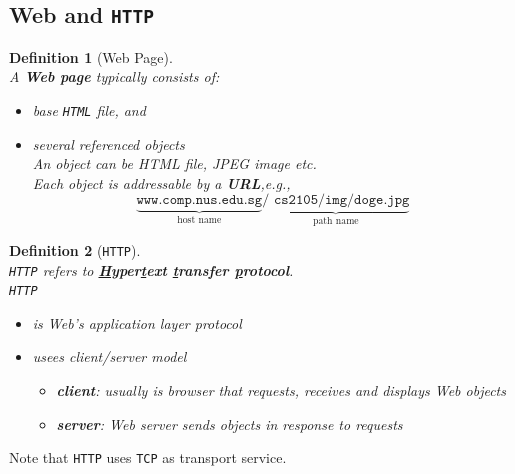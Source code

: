 \documentclass[12pt]{article}
\newtheorem{definition}{Definition}[section]
\theoremstyle{definition}
\begin{document}
\subsection{Web and \texttt{HTTP}}
\begin{definition}[Web Page]
\hfill\\\normalfont A \textbf{Web page} typically consists of:
\begin{itemize}
  \item base \texttt{HTML} file, and
  \item several referenced \textit{objects}\\An object can be HTML file, JPEG image etc.\\Each object is addressable by a \textbf{URL},e.g.,
  \[
\underbrace{\texttt{www.comp.nus.edu.sg}}_{\text{host name}}\underbrace{\texttt{/~cs2105/img/doge.jpg}}_{\text{path name}}
  \]

\end{itemize}
\end{definition}
\begin{definition}[\texttt{HTTP}]
\hfill\\\normalfont \texttt{HTTP} refers to \textbf{\underline{H}yper\underline{t}ext \underline{t}ransfer \underline{p}rotocol}.\\\texttt{HTTP}
\begin{itemize}
  \item is Web's application layer protocol
  \item usees client/server model
  \begin{itemize}
    \item \textbf{client}: usually is browser that requests, receives and displays Web objects
    \item \textbf{server}: Web server sends objects in response to requests
  \end{itemize}
\end{itemize}
\end{definition} 
Note that \texttt{HTTP} uses \texttt{TCP} as transport service.\\
\end{document}
